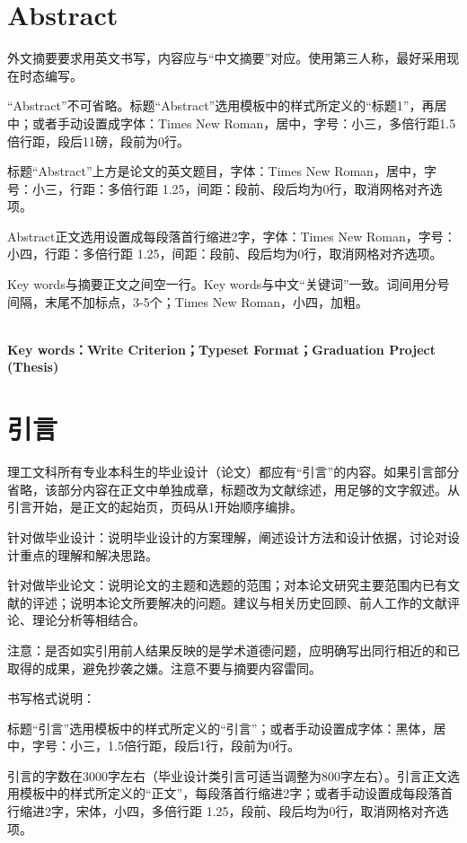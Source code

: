\documentclass[UTF8,a4paper]{ctexart}
\numberwithin{table}{section}
\numberwithin{equation}{section}
\begin{document}
	\section*{\fontsize{15}{22.5} Abstract}
	外文摘要要求用英文书写，内容应与“中文摘要”对应。使用第三人称，最好采用现在时态编写。\par 
	“Abstract”不可省略。标题“Abstract”选用模板中的样式所定义的“标题1”，再居中；或者手动设置成字体：Times New Roman，居中，字号：小三，多倍行距1.5倍行距，段后11磅，段前为0行。\par 
	标题“Abstract”上方是论文的英文题目，字体：Times New Roman，居中，字号：小三，行距：多倍行距 1.25，间距：段前、段后均为0行，取消网格对齐选项。\par 
	Abstract正文选用设置成每段落首行缩进2字，字体：Times New Roman，字号：小四，行距：多倍行距 1.25，间距：段前、段后均为0行，取消网格对齐选项。\par 
	Key words与摘要正文之间空一行。Key words与中文“关键词”一致。词间用分号间隔，末尾不加标点，3-5个；Times New Roman，小四，加粗。\par 
	\quad \\
	{\bf{Key words：Write Criterion；Typeset Format；Graduation Project (Thesis)} }
	
	\newpage
	\tableofcontents
	\newpage
	\setcounter{page}{1}
	\section*{\fontsize{15}{22.5} {\heiti 引\quad\quad 言}}
	理工文科所有专业本科生的毕业设计（论文）都应有“引言”的内容。如果引言部分省略，该部分内容在正文中单独成章，标题改为文献综述，用足够的文字叙述。从引言开始，是正文的起始页，页码从1开始顺序编排。\par 
	针对做毕业设计：说明毕业设计的方案理解，阐述设计方法和设计依据，讨论对设计重点的理解和解决思路。\par 
	针对做毕业论文：说明论文的主题和选题的范围；对本论文研究主要范围内已有文献的评述；说明本论文所要解决的问题。建议与相关历史回顾、前人工作的文献评论、理论分析等相结合。\par 
	注意：是否如实引用前人结果反映的是学术道德问题，应明确写出同行相近的和已取得的成果，避免抄袭之嫌。注意不要与摘要内容雷同。\par 
	书写格式说明：\par 
	标题“引言”选用模板中的样式所定义的“引言”；或者手动设置成字体：黑体，居中，字号：小三，1.5倍行距，段后1行，段前为0行。\par
	引言的字数在3000字左右（毕业设计类引言可适当调整为800字左右）。引言正文选用模板中的样式所定义的“正文”，每段落首行缩进2字；或者手动设置成每段落首行缩进2字，宋体，小四，多倍行距 1.25，段前、段后均为0行，取消网格对齐选项。
	\newpage
\end{document}
